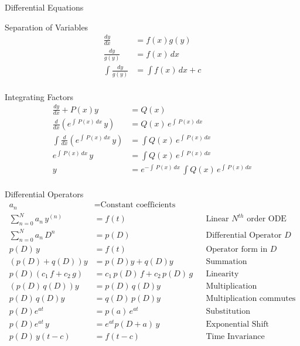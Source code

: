 \begin{section}{Differential Equations}
  \begin{subsection}{Separation of Variables}
    \begin{align*}
      \frac{dy}{dx} &= f(x)g(y) \\
      \frac{dy}{g(y)} &= f(x)\,dx \\
      \int{\frac{dy}{g(y)}} &= \int{f(x)}\,dx+c \\
    \end{align*}
  \end{subsection}
  \begin{subsection}{Integrating Factors}
    \begin{align*}
      \frac{dy}{dx} + P(x)y &= Q(x) \\
      \frac{d}{dx}(e^{\int\,P(x)\,dx}\,y) &= Q(x)\,e^{\int\,P(x)\,dx} \\
      \int{\frac{d}{dx}(e^{\int\,P(x)\,dx}\,y)} &= \int{Q(x)\,e^{\int\,P(x)\,dx}} \\
      e^{\int\,P(x)\,dx}\,y &= \int{Q(x)\,e^{\int\,P(x)\,dx}} \\
      y &= e^{-\int\,P(x)\,dx}\,\int{Q(x)\,e^{\int\,P(x)\,dx}} \\
    \end{align*}
  \end{subsection}
  \begin{subsection}{Differential Operators}
    \begin{align*}
      a_n &= \text{Constant coefficients} \\
      \sum_{n=0}^{N} a_n\,y^{(n)} &= f(t) && \text{Linear $N^{th}$ order ODE} \\
      \sum_{n=0}^{N} a_n\,D^{n} &= p(D) && \text{Differential Operator $D$} \\
      p(D)\,y &= f(t) && \text{Operator form in $D$} \\
      (p(D) + q(D))y &= p(D)y + q(D)y && \text{Summation} \\
      p(D)(c_1\,f + c_2\,g) &=
      c_1\,p(D)\,f +  c_2\,p(D)\,g && \text{Linearity} \\
      (p(D)\,q(D))y &= p(D)\,q(D)y && \text{Multiplication} \\
      p(D)\,q(D)y &= q(D)\,p(D)y && \text{Multiplication commutes} \\
      p(D)e^{at} &= p(a)\,e^{at} && \text{Substitution} \\
      p(D)e^{at}\,y &= e^{at}p(D+a)\,y && \text{Exponential Shift} \\
      p(D)\,y(t-c) &= f(t-c) && \text{Time Invariance} \\

\end{align*}
\end{subsection}
\end{section}
